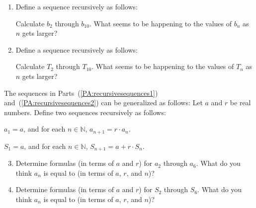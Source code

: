 \begin{previewactivity} \label{PA:recursivesequences} \hfill
\begin{enumerate}
\item Define a sequence recursively as follows: \label{PA:recursivesequences1}


Calculate  $b_2 $ through  $b_{10} $. What seems to be happening to the values of  $b_n $
as  $n$  gets larger?

\item Define a sequence recursively as follows: \label{PA:recursivesequences2}


Calculate  $T_2 $ through  $T_{10} $.  What seems to be happening to the values of  $T_n $
as  $n$  gets larger?

\end{enumerate}

\noindent
The sequences in Parts~(\ref{PA:recursivesequences1}) and~(\ref{PA:recursivesequences2}) can be generalized as follows:  Let  $a$  and  $r$  be real numbers.  Define two sequences recursively as follows:

\begin{list}{}
\item $a_1  = a$, and for each  $n \in \mathbb{N}$,  $a_{n + 1}  = r \cdot a_n $.

\item $S_1  = a$, and for each  $n \in \mathbb{N}$,  $S_{n + 1}  = a + r \cdot S_n $.
\end{list}

\begin{enumerate}
\setcounter{enumi}{2}
\item Determine  formulas (in terms of  $a$  and  $r$) for  $a_2 $ through  $a_6 $.  What do you think  $a_n $ is equal to (in terms of  $a$, $r$, and  $n$)?

\item Determine  formulas (in terms of  $a$  and  $r$) for  $S_2 $ through  $S_6 $.  What do you think  $a_n $ is equal to (in terms of  $a$, $r$, and  $n$)?

\end{enumerate}

\end{previewactivity}
\hbreak






\endinput

